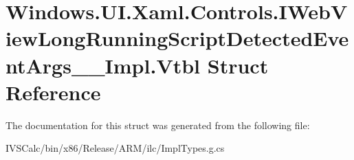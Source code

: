 \hypertarget{struct_windows_1_1_u_i_1_1_xaml_1_1_controls_1_1_i_web_view_long_running_script_detected_event_args_____impl_1_1_vtbl}{}\section{Windows.\+U\+I.\+Xaml.\+Controls.\+I\+Web\+View\+Long\+Running\+Script\+Detected\+Event\+Args\+\_\+\+\_\+\+Impl.\+Vtbl Struct Reference}
\label{struct_windows_1_1_u_i_1_1_xaml_1_1_controls_1_1_i_web_view_long_running_script_detected_event_args_____impl_1_1_vtbl}


The documentation for this struct was generated from the following file\+:\begin{DoxyCompactItemize}
\item 
I\+V\+S\+Calc/bin/x86/\+Release/\+A\+R\+M/ilc/Impl\+Types.\+g.\+cs\end{DoxyCompactItemize}
